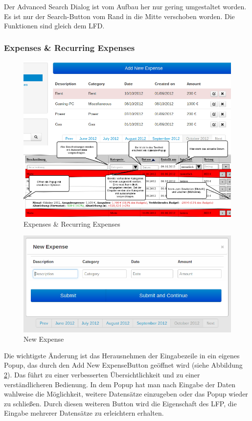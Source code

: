 \documentclass[a4paper,10pt]{article}
\begin{document}
Der Advanced Search Dialog ist vom Aufbau her nur gering umgestaltet worden. Es ist nur der Search-Button vom Rand in die
Mitte verschoben worden. Die Funktionen sind gleich dem LFD.

\clearpage
\subsubsection{Expenses \& Recurring Expenses}

\begin{figure}
\centering
\includegraphics[width=\textwidth]{expenses}
\caption{Expenses \& Recurring Expenses} \label{fig:expenses}
\end{figure}

\begin{figure}
\centering
\includegraphics[width=\textwidth]{expenses-new-ip}
\caption{New Expense} \label{fig:expenses-new}
\end{figure}

Die wichtigste \"Anderung ist das Herausnehmen der Eingabezeile in ein eigenes Popup,
das durch den \glqq Add New Expense\grqq\space Button
ge\"offnet wird (siehe Abbildung \ref{fig:expenses-new}). Das f\"uhrt zu einer verbesserten \"Ubersichtlichkeit und zu einer verst\"andlicheren Bedienung.
In dem Popup hat man nach Eingabe der Daten wahlweise die M\"oglichkeit, weitere Datens\"atze einzugeben oder das Popup wieder
zu schlie\ss en. Durch diesen weiteren Button wird die Eigenschaft des LFP, die
Eingabe mehrerer Datens\"atze zu erleichtern erhalten.
\end{document}
